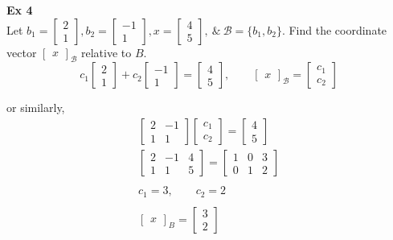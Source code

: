 \documentclass{article}
\begin{document}
  \textbf{Ex 4}\\
  Let $ b_1=\begin{bmatrix}
    2\\
    1
  \end{bmatrix}, b_2=\begin{bmatrix}
    -1\\
    1
  \end{bmatrix}, x=\begin{bmatrix}
    4\\
    5
  \end{bmatrix}, ~\&~ \mathcal{B}=\{ b_1,b_2 \} $. Find the coordinate vector $ \begin{bmatrix}
    x
  \end{bmatrix}_\mathcal{B} $ relative to $ B $. 
  \[
    c_1\begin{bmatrix}
      2\\
      1
    \end{bmatrix}+c_2\begin{bmatrix}
      -1\\
      1
    \end{bmatrix}=\begin{bmatrix}
      4\\
      5
    \end{bmatrix}, \qquad
    \begin{bmatrix}
      x
    \end{bmatrix}_\mathcal{B}=\begin{bmatrix}
      c_1\\
      c_2
    \end{bmatrix}
  \]
  
  or similarly,
  \[
    \begin{gathered}
    \begin{bmatrix}
      2 &-1\\
      1 &1
    \end{bmatrix}
    \begin{bmatrix}
      c_1\\
      c_2
    \end{bmatrix}=\begin{bmatrix}
      4\\
      5
    \end{bmatrix}\\
    \begin{bmatrix}
      2 &-1 &4\\
      1 &1 &5
    \end{bmatrix} = \begin{bmatrix}
      1 &0 &3\\
      0 &1 &2
    \end{bmatrix}\\
    ~\\
    c_1 = 3, \qquad c_2=2\\
    ~\\
    \boxed{\begin{bmatrix}
      x
    \end{bmatrix}_B=
    \begin{bmatrix}
      3\\
      2
    \end{bmatrix}}
    \end{gathered}
  \]
\end{document}
